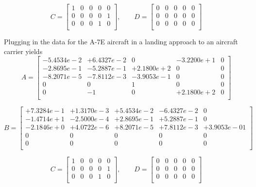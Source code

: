 \documentclass[12pt]{article}
\begin{document}
$$
C =
\begin{bmatrix}
    1 & 0 & 0 & 0 & 0\\
    0 & 0 & 0 & 0 & 1\\
    0 & 0 & 0 & 1 & 0\\
\end{bmatrix},
\qquad
D =
\begin{bmatrix}
    0 & 0 & 0 & 0 & 0\\
    0 & 0 & 0 & 0 & 0\\
    0 & 0 & 0 & 0 & 0\\
\end{bmatrix}
$$

\clearpage
\noindent Plugging in the data for the A-7E aircraft in a landing approach to an aircraft carrier yields
\begin{equation*}
A =
\begin{bmatrix}
  -5.4534e-2 & +6.4327e-2 &          0 & -3.2200e+1 &           0 \\
  -2.8695e-1 & -5.2887e-1 & +2.1800e+2 &          0 &           0 \\
  -8.2071e-5 & -7.8112e-3 & -3.9053e-1 &          0 &           0 \\
           0 &          0 &          1 &          0 &           0 \\
           0 &         -1 &          0 & +2.1800e+2 &           0 \\
\end{bmatrix}
\end{equation*}

\begin{equation*}
B =
\begin{bmatrix}
  +7.3284e-1 & +1.3170e-3 & +5.4534e-2 & -6.4327e-2 &           0 \\
  -1.4714e+1 & -2.5000e-4 & +2.8695e-1 & +5.2887e-1 &           0 \\
  -2.1846e+0 & +4.0722e-6 & +8.2071e-5 & +7.8112e-3 & +3.9053e-01 \\
           0 &          0 &          0 &          0 &           0 \\
           0 &          0 &          0 &          0 &           0 \\
\end{bmatrix}
\end{equation*}

$$
C =
\begin{bmatrix}
    1 & 0 & 0 & 0 & 0\\
    0 & 0 & 0 & 0 & 1\\
    0 & 0 & 0 & 1 & 0\\
\end{bmatrix},
\qquad
D =
\begin{bmatrix}
    0 & 0 & 0 & 0 & 0\\
    0 & 0 & 0 & 0 & 0\\
    0 & 0 & 0 & 0 & 0\\
\end{bmatrix}
$$

\end{document}
